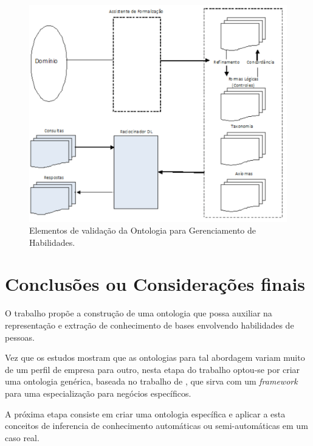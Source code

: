 \documentclass[hyphens,11pt,a4paper]{article}
\begin{document}
\begin{figure}[h]
\begin{center}
\includegraphics[width=.7\textwidth]{vaston.pdf}
\end{center}
\caption{Elementos de validação da Ontologia para Gerenciamento de Habilidades.\label{figura1}} 
\end{figure}


\section*{Conclusões ou Considerações finais}

O trabalho propõe a construção de uma ontologia que possa auxiliar na representação e extração de conhecimento de bases envolvendo habilidades de pessoas.

Vez que os estudos mostram que as ontologias para tal abordagem variam muito de um perfil de empresa para outro, nesta etapa do trabalho optou-se por criar uma ontologia genérica, baseada no trabalho de \cite{AOW07}, que sirva com um \emph{framework} para uma especialização para negócios específicos.

A próxima etapa consiste em criar uma ontologia específica e aplicar a esta conceitos de inferencia de conhecimento automáticas ou semi-automáticas em um caso real.


%


\end{document}
